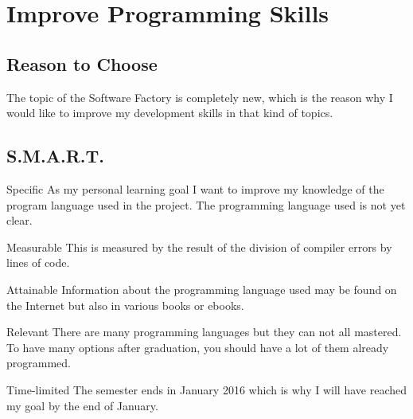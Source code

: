 \section{Improve Programming Skills}
	\subsection{Reason to Choose}
		The topic of the Software Factory is completely new, which is the reason why I would like to improve my development skills in that kind of topics.

	\subsection{S.M.A.R.T.}
		\begin{SMART}
			\item[Specific] As my personal learning goal I want to improve my knowledge of the program language used in the project. The programming language used is not yet clear.
			\item[Measurable] This is measured by the result of the division of compiler errors by lines of code.
			\item[Attainable] Information about the programming language used may be found on the Internet but also in various books or ebooks.
			\item[Relevant] There are many programming languages but they can not all mastered. To have many options after graduation, you should have a lot of them already programmed.
			\item[Time-limited] The semester ends in January 2016 which is why I will have reached my goal by the end of January.
		\end{SMART}

